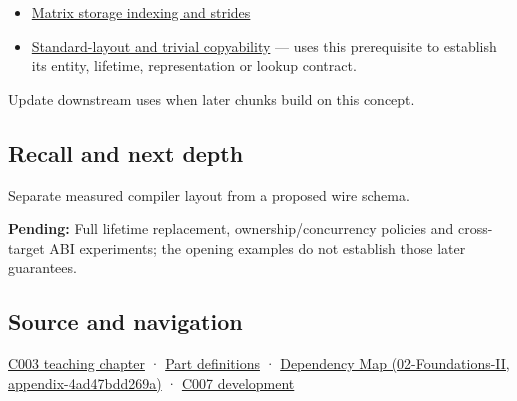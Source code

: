 \begin{itemize}
\item
  \hyperref[appendix-ffdc1d4e5350]{Matrix storage indexing and strides}
\item
  \hyperref[appendix-958870a64c53]{Standard-layout and trivial copyability} --- uses this prerequisite to establish its entity, lifetime, representation or lookup contract.
\end{itemize}

Update downstream uses when later chunks build on this concept.

\subsection{Recall and next depth}\label{appendix-c4ac6bb0fff8-recall-and-next-depth}

Separate measured compiler layout from a proposed wire schema.

\textbf{Pending:} Full lifetime replacement, ownership/concurrency policies and cross-target ABI experiments; the opening examples do not establish those later guarantees.

\subsection{Source and navigation}\label{appendix-c4ac6bb0fff8-source-and-navigation}

\hyperref[01-foundations-i-ch002-where-the-bytes-live]{C003 teaching chapter} · \hyperref[appendix-fd090d982a15-m003---parts-41-60]{Part definitions} · \href{../02-Foundations-II/main.pdf\#nameddest=appendix-4ad47bdd269a}{Dependency Map (02-Foundations-II, appendix-4ad47bdd269a)} · \hyperref[01-foundations-i-ch003-bringing-the-object-model-back-to-bytes]{C007 development}
